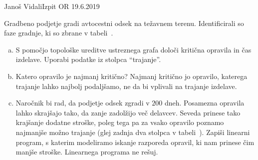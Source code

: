 \begin{naloga}{Janoš Vidali}{Izpit OR 19.6.2019}
\begin{vprasanje}
Gradbeno podjetje gradi avtocestni odsek na težavnem terenu.
Identificirali so faze grad\-nje, ki so zbrane v tabeli~\tab.

\begin{enumerate}[(a)]
\item S pomočjo topološke ureditve ustreznega grafa določi kritična opravila
in čas izdelave.
Uporabi podatke iz stolpca ``trajanje''.

\item Katero opravilo je najmanj kritično?
Najmanj kritično jo opravilo,
katerega trajanje lahko najbolj podaljšamo,
ne da bi vplivali na trajanje izdelave.

\item Naročnik bi rad, da podjetje odsek zgradi v $200$ dneh.
Posamezna opravila lahko skrajšajo tako, da zanje zadolžijo več delavcev.
Seveda prinese tako krajšanje dodatne stroške,
poleg tega pa za vsako opravilo poznamo najmanjše možno trajanje
(glej zadnja dva stolpca v tabeli~\tab).
Zapiši linearni program,
s katerim modeliramo iskanje razporeda opravil,
ki nam prinese čim manjše stroške.
Linearnega programa ne rešuj.
\end{enumerate}
%
\begin{tabela}
\end{tabela}
\end{vprasanje}


\end{naloga}
